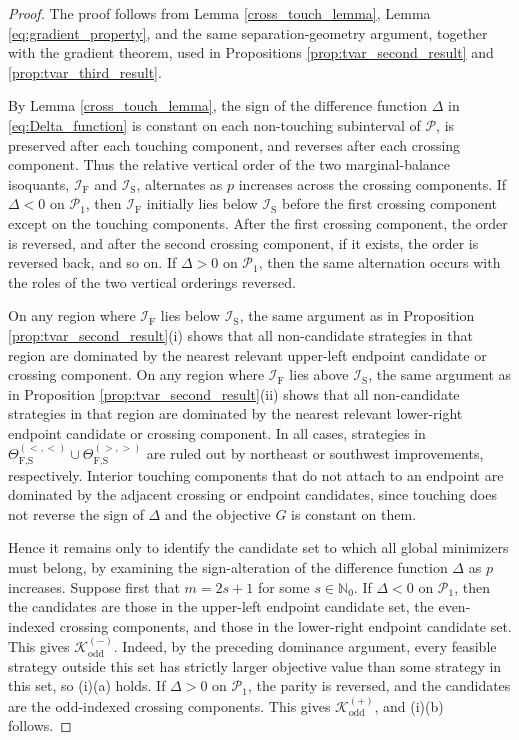 \documentclass[a4paper,12pt]{article}
\begin{document}
\begin{proof}
The proof follows from Lemma \ref{cross_touch_lemma}, Lemma \ref{eq:gradient_property}, and the same separation-geometry argument, together with the gradient theorem, used in Propositions \ref{prop:tvar_second_result} and \ref{prop:tvar_third_result}.

By Lemma \ref{cross_touch_lemma}, the sign of the difference function $\Delta$ in \eqref{eq:Delta_function} is constant on each non-touching subinterval of $\mathcal{P}$, is preserved after each touching component, and reverses after each crossing component. Thus the relative vertical order of the two marginal-balance isoquants, $\mathcal{I}_{\text{F}}$ and $\mathcal{I}_{\text{S}}$, alternates as $p$ increases across the crossing components. If $\Delta<0$ on $\mathcal{P}_1$, then $\mathcal{I}_{\text{F}}$ initially lies below $\mathcal{I}_{\text{S}}$ before the first crossing component except on the touching components. After the first crossing component, the order is reversed, and after the second crossing component, if it exists, the order is reversed back, and so on. If $\Delta>0$ on $\mathcal{P}_1$, then the same alternation occurs with the roles of the two vertical orderings reversed.

On any region where $\mathcal{I}_{\text{F}}$ lies below $\mathcal{I}_{\text{S}}$, the same argument as in Proposition \ref{prop:tvar_second_result}(i) shows that all non-candidate strategies in that region are dominated by the nearest relevant upper-left endpoint candidate or crossing component. On any region where $\mathcal{I}_{\text{F}}$ lies above $\mathcal{I}_{\text{S}}$, the same argument as in Proposition \ref{prop:tvar_second_result}(ii) shows that all non-candidate strategies in that region are dominated by the nearest relevant lower-right endpoint candidate or crossing component. In all cases, strategies in $\Theta_{\text{F,S}}^{\left(<,<\right)}\cup\Theta_{\text{F,S}}^{\left(>,>\right)}$ are ruled out by northeast or southwest improvements, respectively. Interior touching components that do not attach to an endpoint are dominated by the adjacent crossing or endpoint candidates, since touching does not reverse the sign of $\Delta$ and the objective $G$ is constant on them.

Hence it remains only to identify the candidate set to which all global minimizers must belong, by examining the sign-alteration of the difference function $\Delta$ as $p$ increases. Suppose first that $m=2s+1$ for some $s\in\mathbb{N}_0$. If $\Delta<0$ on $\mathcal{P}_1$, then the candidates are those in the upper-left endpoint candidate set, the even-indexed crossing components, and those in the lower-right endpoint candidate set. This gives $\mathcal{K}_{\text{odd}}^{\left(-\right)}$. Indeed, by the preceding dominance argument, every feasible strategy outside this set has strictly larger objective value than some strategy in this set, so (i)(a) holds. If $\Delta>0$ on $\mathcal{P}_1$, the parity is reversed, and the candidates are the odd-indexed crossing components. This gives $\mathcal{K}_{\text{odd}}^{\left(+\right)}$, and (i)(b) follows.


\end{proof}
\end{document}
